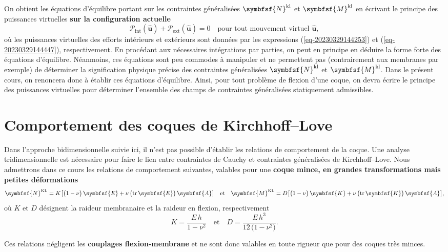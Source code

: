 \documentclass[
  a4paper,
  DIV=11,
  numbers=noendperiod]{scrreprt}
\newcommand{\external}{\mathrm{ext}}
\newcommand{\internal}{\mathrm{int}}
\newcommand{\KL}{\mathrm{KL}}
\newcommand{\kl}{\mathrm{kl}}
\newcommand{\tens}[1]{\symbfsf{#1}}
\newcommand{\tr}{\operatorname{tr}}
\renewcommand{\vec}[1]{\symbf{#1}}
\begin{document}
On obtient les équations d'équilibre portant sur les contraintes
généralisées \(\tens{N}^\kl\) et \(\tens{M}^\kl\) en écrivant le
principe des puissances virtuelles \textbf{sur la configuration
actuelle} \[
\mathcal{P}_\internal(\hat{\vec{u}}) + \mathcal{P}_\external(\hat{\vec{u}}) = 0 \quad \text{pour tout mouvement virtuel } \hat{\vec{u}},
\] où les puissances virtuelles des efforts intérieurs et extérieurs
sont données par les expressions (\ref{eq-20230329144253}) et
(\ref{eq-20230329144447}), respectivement. En procédant aux nécessaires
intégrations par parties, on peut en principe en déduire la forme forte
des équations d'équilibre. Néanmoins, ces équations sont peu commodes à
manipuler et ne permettent pas (contrairement aux membranes par exemple)
de déterminer la signification physique précise des contraintes
généralisées \(\tens{N}^\kl\) et \(\tens{M}^\kl\). Dans le présent
cours, on renoncera donc à établir ces équations d'équilibre. Ainsi,
pour tout problème de flexion d'une coque, on devra écrire le principe
des puissances virtuelles pour déterminer l'ensemble des champs de
contraintes généralisées statiquement admissibles.

\hypertarget{sec-20230330135827}{%
\section{Comportement des coques de
Kirchhoff--Love}\label{sec-20230330135827}}

Dans l'approche bidimensionnelle suivie ici, il n'est pas possible
d'établir les relations de comportement de la coque. Une analyse
tridimensionnelle est nécessaire pour faire le lien entre contraintes de
Cauchy et contraintes généralisées de Kirchhoff--Love. Nous admettrons
dans ce cours les relations de comportement suivantes, valables pour une
\textbf{coque mince, en grandes transformations mais petites
déformations} \[
\tens{N}^\KL = K \bigl[ \bigl( 1 - \nu \bigr) \, \tens{E} + \nu \, \bigl( \tr \tens{E} \bigr) \, \tens{A} \bigr]
\quad \text{et} \quad
\tens{M}^\KL = D \bigl[ \bigl( 1 - \nu \bigr) \, \tens{K} + \nu \, \bigl( \tr \tens{K} \bigr) \, \tens{A} \bigr],
\] où \(K\) et \(D\) désignent la raideur membranaire et la raideur en
flexion, respectivement \[
K = \frac{E \, h}{1 - \nu^2} \quad \text{et} \quad D = \frac{E \, h^3}{12 \, \bigl( 1 - \nu^2 \bigr)}.
\]

Ces relations négligent les \textbf{couplages flexion-membrane} et ne
sont donc valables en toute rigueur que pour des coques très minces.
\end{document}
